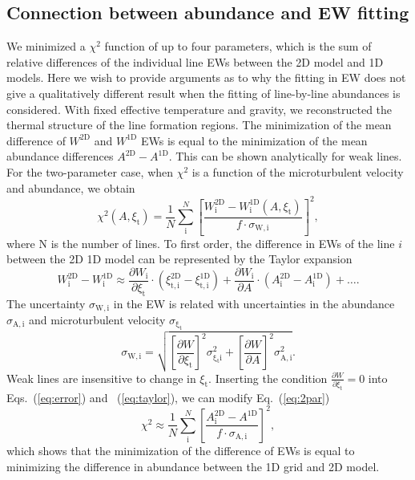 \documentclass{aa}
\begin{document}
\subsection{Connection between abundance and EW fitting}
We minimized a $\chi^2$ function of up to four parameters, 
which is the sum of relative differences of  the individual line 
EWs between the 2D model and 1D models. Here we wish to provide
arguments as to why the fitting in EW does not give a qualitatively
different result when the fitting of line-by-line abundances
is considered.
With fixed effective temperature and gravity, 
we reconstructed the thermal structure of the line formation regions.
The minimization of the mean difference of $W^\mathrm{2D}$ 
and $W^\mathrm{1D}$ EWs is equal to the minimization 
of the mean abundance differences $A^\mathrm{2D} -A^\mathrm{1D}$. 
This can be shown analytically for weak lines.  
For the two-parameter case, when $\chi^2$  is a 
function of the microturbulent velocity and abundance, we obtain 
%
\begin{equation} \label{eq:2par}
    \chi^2( A, \xi_\mathrm{t})=\frac{1}{N}\sum_{\mathrm {i}}^N 
    \left [ \frac{ W^\mathrm{2D}_\mathrm {i} 
    -W^\mathrm{1D}_\mathrm {i}( A, \xi_\mathrm{t})  }
    {f \cdot \sigma_\mathrm{W,i}} \right]^2,
\end{equation}
where N is the number of lines. 
To first order, the  difference in EWs 
of  the line $i$ between the 2D 
1D model can be represented by the Taylor expansion 
%
\begin{equation} \label{eq:taylor}
 W^\mathrm{2D}_\mathrm {i} - W^\mathrm{1D}_\mathrm {i} \approx
 \frac{\partial W_\mathrm {i}}{\partial \xi_\mathrm {t}} \cdot (\xi_\mathrm{t,i}^\mathrm{2D} 
 - \xi_\mathrm{t,i}^\mathrm{1D}) +
  \frac{\partial W_\mathrm {i}}{\partial A} \cdot (A_\mathrm{i}^\mathrm{2D} 
 - A_\mathrm{i}^\mathrm{1D}) +\ldots .
\end{equation}
%
The  uncertainty  $\sigma_\mathrm{W,i}$ in the EW 
is related with uncertainties in the abundance $\sigma_\mathrm{A,i}$ and  
microturbulent velocity $\sigma_\mathrm{\xi_\mathrm{t}}$ 
%
\begin{equation} \label{eq:error}
\sigma_\mathrm{W,i}=\sqrt{ \left[ 
\frac{\partial W} {\partial \xi_\mathrm{t}} 
                           \right ]^2 
\sigma^2_\mathrm{\xi_\mathrm{t}i} +\left[ 
\frac{\partial W} {\partial A} 
                           \right ]^2 
\sigma^2_\mathrm{A,i}}.
\end{equation}
%
Weak lines are insensitive to change in $\xi_\mathrm{t}$.  
Inserting the 
condition $\frac{\partial W} {\partial \xi_\mathrm{t}}=0$ 
into Eqs.~(\ref{eq:error}) and ~(\ref{eq:taylor}), we can modify 
Eq.~(\ref{eq:2par})
%
\begin{equation}
    \chi^2 \approx \frac{1}{N}\sum_{\mathrm {i}}^N 
    \left [ \frac{ A^\mathrm{2D}_\mathrm {i} 
    -A^\mathrm{1D}}{f \cdot \sigma_\mathrm{A,i}} \right]^2,
\end{equation}
%
which shows that the minimization of the difference of EWs
is equal to minimizing the difference in abundance between the 1D grid
and 2D model.
\end{document}
